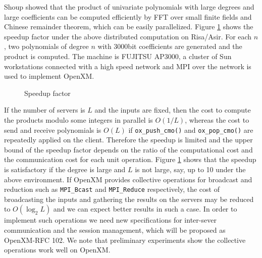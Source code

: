 Shoup \cite{Shoup} showed that the product of univariate polynomials
with large degrees and large coefficients can be computed efficiently
by FFT over small finite fields and Chinese remainder theorem,
which can be easily parallelized.
%
%
Figure \ref{speedup}
shows the speedup factor under the above distributed computation
on Risa/Asir. For each $n$, two polynomials of degree $n$
with 3000bit coefficients are generated and the product is computed.
The machine is FUJITSU AP3000,
a cluster of Sun workstations connected with a high speed network 
and MPI over the network is used to implement OpenXM.
\begin{figure}[htbp]
\epsfxsize=10cm
\caption{Speedup factor}
\label{speedup}
\end{figure}
If the number of servers is $L$ and the inputs are fixed, then the cost to
compute the products modulo some integers in parallel is $O(1/L)$, 
whereas the cost
to send and receive polynomials is $O(L)$ if {\tt ox\_push\_cmo()} and
{\tt ox\_pop\_cmo()} are repeatedly applied on the client.
Therefore the speedup is limited and the upper bound of
the speedup factor depends on the ratio of 
the computational cost and the communication cost for each unit operation.
Figure \ref{speedup} shows that 
the speedup is satisfactory if the degree is large and $L$
is not large, say, up to 10 under the above environment.
If OpenXM provides collective operations for broadcast and reduction
such as {\tt MPI\_Bcast} and {\tt MPI\_Reduce} respectively, the cost of 
broadcasting the inputs and gathering the results on the servers
may be reduced to $O(\log_2L)$
and we can expect better results in such a case. In order to implement
such operations we need new specifications for inter-sever communication
and the session management, which will be proposed as OpenXM-RFC 102.
We note that preliminary experiments show the collective operations
work well on OpenXM.

